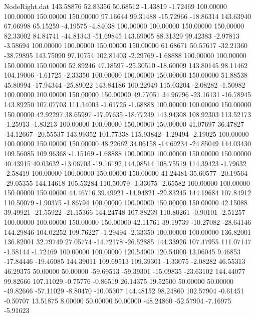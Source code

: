 \begin{filecontents}{NodeRight.dat}
 143.58876   52.83356   50.68512    -1.43819   -1.72469  100.00000  100.00000  150.00000  150.00000   97.16644   99.31488  -15.72966  -18.86314
 143.63940   67.66998   65.15259    -4.19575   -4.84038  100.00000  100.00000  150.00000  150.00000   82.33002   84.84741  -44.81343  -51.69845
 143.69005   88.31329   99.42383    -2.97813   -3.58694  100.00000  100.00000  150.00000  150.00000   61.68671   50.57617  -32.21360  -38.79895
 143.75090   97.10754  102.81403    -2.29769   -1.68888  100.00000  100.00000  150.00000  150.00000   52.89246   47.18597  -25.30510  -18.60009
 143.80145   98.11462  104.19006    -1.61725   -2.33350  100.00000  100.00000  150.00000  150.00000   51.88538   45.80994  -17.94344  -25.89022
 143.84186  100.22949  115.03204    -2.08282   -1.50982  100.00000  100.00000  150.00000  150.00000   49.77051   34.96796  -23.16131  -16.78945
 143.89250  107.07703  111.34003    -1.61725   -1.68888  100.00000  100.00000  150.00000  150.00000   42.92297   38.65997  -17.97635  -18.77249
 143.94308  108.92303  113.52173    -1.25913   -1.83213  100.00000  100.00000  150.00000  150.00000   41.07697   36.47827  -14.12667  -20.55537
 143.99352  101.77338  115.93842    -1.29494   -2.19025  100.00000  100.00000  150.00000  150.00000   48.22662   34.06158  -14.69234  -24.85049
 144.03430  109.56085  109.96368    -1.15169   -1.68888  100.00000  100.00000  150.00000  150.00000   40.43915   40.03632  -13.06703  -19.16192
 144.08514  108.75519  114.39423    -1.79632   -2.58419  100.00000  100.00000  150.00000  150.00000   41.24481   35.60577  -20.19564  -29.05355
 144.14618  105.53284  110.50079    -1.33075   -2.65582  100.00000  100.00000  150.00000  150.00000   44.46716   39.49921  -14.94821  -29.83245
 144.19684  107.84912  110.50079    -1.90375   -1.86794  100.00000  100.00000  150.00000  150.00000   42.15088   39.49921  -21.55922  -21.15366
 144.24748  107.88239  110.80261    -0.90101   -2.51257  100.00000  100.00000  150.00000  150.00000   42.11761   39.19739  -10.27082  -28.64146
 144.29846  104.02252  109.76227    -1.29494   -2.33350  100.00000  100.00000  136.82001  136.82001   32.79749   27.05774  -14.72178  -26.52885
 144.33926  107.47955  111.07147    -1.58144   -1.72469  100.00000  100.00000  120.54000  120.54000   13.06045    9.46853  -17.84446  -19.46085
 144.39011  109.69513  109.39301    -1.33075   -2.08282   46.55313   46.29375   50.00000   50.00000  -59.69513  -59.39301  -15.09835  -23.63102
 144.44077   99.82666  107.11029    -0.75776   -0.86519   26.14375   19.52500   50.00000   50.00000  -49.82666  -57.11029   -8.80470  -10.05307
 144.48152   98.24860  102.57904    -0.61451   -0.50707   13.51875    8.00000   50.00000   50.00000  -48.24860  -52.57904   -7.16975   -5.91623

\end{filecontents}
